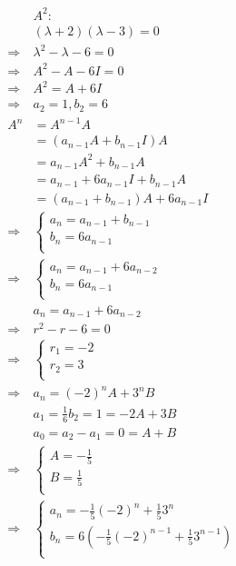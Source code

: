 \documentclass{article}
\begin{document}
\begin{equation*}
    \begin{split}
        &A^2:\\
        &(\lambda+2)(\lambda-3)=0\\
        \Rightarrow&\lambda^2-\lambda-6=0\\
        \Rightarrow&A^2-A-6I=0\\
        \Rightarrow&A^2=A+6I\\
        \Rightarrow&a_2=1,b_2=6\\
        A^n&=A^{n-1}A\\
        &=(a_{n-1}A+b_{n-1}I)A\\
        &=a_{n-1}A^2+b_{n-1}A\\
        &=a_{n-1}+6a_{n-1}I+b_{n-1}A\\
        &=(a_{n-1}+b_{n-1})A+6a_{n-1}I\\
        \Rightarrow&\begin{cases}
            a_n=a_{n-1}+b_{n-1}\\
            b_n=6a_{n-1}\\
        \end{cases}\\
        \Rightarrow&\begin{cases}
            a_n=a_{n-1}+6a_{n-2}\\
            b_n=6a_{n-1}\\
        \end{cases}\\
        &a_n=a_{n-1}+6a_{n-2}\\
        \Rightarrow&r^2-r-6=0\\
        \Rightarrow&\begin{cases}
            r_1=-2\\
            r_2=3\\
        \end{cases}\\
        \Rightarrow&a_n=(-2)^nA+3^nB\\
        &a_1=\frac{1}{6}b_2=1=-2A+3B\\
        &a_0=a_2-a_1=0=A+B\\
        \Rightarrow&\begin{cases}
            A=-\frac{1}{5}\\
            B=\frac{1}{5}\\
        \end{cases}\\
        \Rightarrow&\begin{cases}
            a_n=-\frac{1}{5}(-2)^n+\frac{1}{5}3^n\\
            b_n=6(-\frac{1}{5}(-2)^{n-1}+\frac{1}{5}3^{n-1})\\
        \end{cases}
    \end{split}
\end{equation*}
\end{document}
